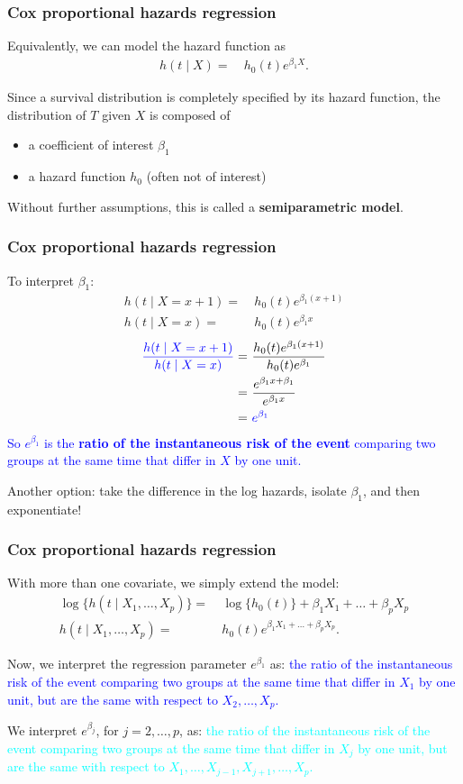 \documentclass[12pt, 
hyperref={colorlinks=true, linkcolor=blue, urlcolor=cyan},dvipsnames]{beamer}
\begin{document}
\begin{frame}
\frametitle{Cox proportional hazards regression}
Equivalently, we can model the hazard function as
\begin{align*}
h(t \mid X) = & \ h_0(t)e^{\beta_1 X}.
\end{align*}

Since a survival distribution is completely specified by its hazard function, the distribution of $T$ given $X$ is composed of
\begin{itemize}
\item a coefficient of interest $\beta_1$ 
\item a hazard function $h_0$ (often not of interest)
\end{itemize}
Without further assumptions, this is called a \textbf{semiparametric model}.
\end{frame}

\begin{frame}
\frametitle{Cox proportional hazards regression}
To interpret $\beta_1$: 
\begin{align*}
h(t \mid X = x + 1) = & \ h_0(t)e^{\beta_1 (x + 1)}\\
h(t \mid X = x) = & \ h_0(t)e^{\beta_1 x} 
\end{align*}\pause \vspace{-0.3cm}
\begin{align*}
\textcolor{blue}{\frac{h(t \mid X = x + 1)}{h(t \mid X = x)}} = & \ \frac{h_0(t)e^{\beta_1 (x + 1)}}{h_0(t)e^{\beta_1}} \\
=& \ \frac{e^{\beta_1x + \beta_1}}{e^{\beta_1 x}} \\
=& \ \textcolor{blue}{e^{\beta_1 }}
\end{align*}
\textcolor{blue}{So $e^{\beta_1}$ is the \textbf{ratio of the instantaneous risk of the event} comparing two groups at the same time that differ in $X$ by one unit.}

Another option: take the difference in the log hazards, isolate $\beta_1$, and then exponentiate!
\end{frame}

\begin{frame}
\frametitle{Cox proportional hazards regression}
With more than one covariate, we simply extend the model:
\begin{align*}
\log \{h(t \mid X_1, \dots, X_p)\} = & \ \log\{h_0(t)\} + \beta_1 X_1 + \dots + \beta_pX_p \\
h(t \mid X_1, \dots, X_p) = & \ h_0(t)e^{\beta_1X_1 + \dots + \beta_pX_p}.
\end{align*}

Now, we interpret the regression parameter $e^{\beta_1}$ as: \pause \textcolor{blue}{the ratio of the instantaneous risk of the event comparing two groups at the same time that differ in $X_1$ by one unit, but are the same with respect to $X_2, \dots, X_p$.}

We interpret $e^{\beta_j}$, for $j = 2, \dots, p$, as: \pause
\textcolor{cyan}{the ratio of the instantaneous risk of the event comparing two groups at the same time that differ in $X_j$ by one unit, but are the same with respect to $X_1, \dots, X_{j-1}, X_{j+1}, \dots, X_p$.}
\end{frame}
\end{document}
